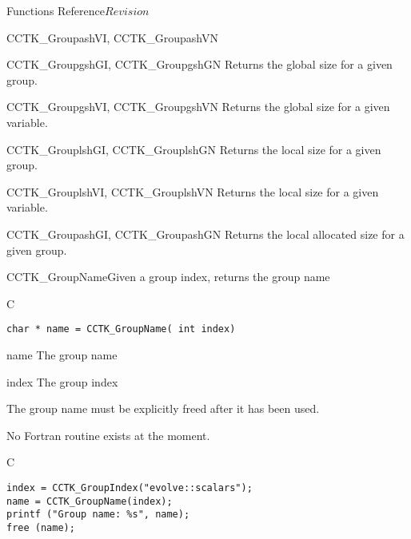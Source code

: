 \begin{cactuspart}{ Functions Reference}{}{$Revision$}
\begin{FunctionDescription}{CCTK\_GroupashVI, CCTK\_GroupashVN}
\begin{SeeAlsoSection}
\begin{SeeAlso}{CCTK\_GroupgshGI, CCTK\_GroupgshGN}
Returns the global size for a given group.
\end{SeeAlso}
\begin{SeeAlso}{CCTK\_GroupgshVI, CCTK\_GroupgshVN}
Returns the global size for a given variable.
\end{SeeAlso}
\begin{SeeAlso}{CCTK\_GrouplshGI, CCTK\_GrouplshGN}
Returns the local size for a given group.
\end{SeeAlso}
\begin{SeeAlso}{CCTK\_GrouplshVI, CCTK\_GrouplshVN}
Returns the local size for a given variable.
\end{SeeAlso}
\begin{SeeAlso}{CCTK\_GroupashGI, CCTK\_GroupashGN}
Returns the local allocated size for a given group.
\end{SeeAlso}
\end{SeeAlsoSection}
\end{FunctionDescription}


\begin{FunctionDescription}{CCTK\_GroupName}{Given a group index, returns the group name}
\label{CCTK-GroupName}
\begin{SynopsisSection}
\begin{Synopsis}{C}
\begin{verbatim}char * name = CCTK_GroupName( int index)\end{verbatim}
\end{Synopsis}
\end{SynopsisSection}
\begin{ParameterSection}
\begin{Parameter}{name}
The group name
\end{Parameter}
\begin{Parameter}{index}
The group index
\end{Parameter}
\end{ParameterSection}
\begin{Discussion}
The group name must be explicitly freed after it has been used.

No Fortran routine exists at the moment.
\end{Discussion}
\begin{ExampleSection}
\begin{Example}{C}
\begin{verbatim}
index = CCTK_GroupIndex("evolve::scalars");
name = CCTK_GroupName(index);
printf ("Group name: %s", name);
free (name);
\end{verbatim}
\end{Example}
\end{ExampleSection}
\end{FunctionDescription}



\end{cactuspart}
